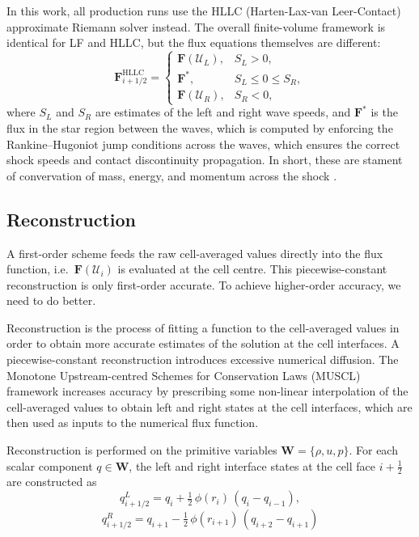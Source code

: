 \documentclass[12pt]{article}
\begin{document}
In this work, all production runs use the HLLC (Harten-Lax-van Leer-Contact) approximate Riemann solver instead. The overall finite-volume framework is identical for LF and HLLC, but the flux equations themselves are different:
\begin{equation}
    \mathbf{F}_{i+1/2}^{\mathrm{HLLC}} = \begin{cases}
        \mathbf{F}(\mathcal{U}_L), & S_L > 0,\\
        \mathbf{F}^*, & S_L \leq 0 \leq S_R,\\
        \mathbf{F}(\mathcal{U}_R), & S_R < 0,
    \end{cases}
\end{equation}
where $S_L$ and $S_R$ are estimates of the left and right wave speeds, and $\mathbf{F}^*$ is the flux in the star region between the waves, which is computed by enforcing the Rankine–Hugoniot jump conditions across the waves, which ensures the correct shock speeds and contact discontinuity propagation. In short, these are stament of convervation of mass, energy, and momentum across the shock \cite{2015EPJH...40..159K}. 

\subsection{Reconstruction}

A first-order scheme feeds the raw cell-averaged values directly into the flux function, i.e.\ $\mathbf{F}(\mathcal{U}_i)$ is evaluated at the cell centre. This piecewise-constant reconstruction is only first-order accurate. To achieve higher-order accuracy, we need to do better.

Reconstruction is the process of fitting a function to the cell-averaged values in order to obtain more accurate estimates of the solution at the cell interfaces. A piecewise-constant reconstruction introduces excessive numerical diffusion. The Monotone Upstream-centred Schemes for Conservation Laws (MUSCL) framework increases accuracy  by prescribing some non-linear interpolation of the cell-averaged values to obtain left and right states at the cell interfaces, which are then used as inputs to the numerical flux function.

Reconstruction is performed on the primitive variables $\mathbf{W} = \{\rho, u, p\}$. For each scalar component $q \in \mathbf{W}$, the left and right interface states at the cell face $i+\tfrac{1}{2}$ are constructed as
\begin{equation}
    q^{L}_{i+1/2} = q_i + \tfrac{1}{2}\,\phi(r_i)\,(q_i - q_{i-1}), 
    \end{equation}
\begin{equation}
    q^{R}_{i+1/2} = q_{i+1} - \tfrac{1}{2}\,\phi(r_{i+1})\,(q_{i+2} - q_{i+1})
\end{equation}
\end{document}
